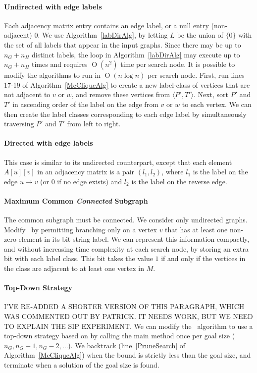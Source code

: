 \documentclass[letterpaper]{article}
\newcommand{\citet}[1]{\citeauthor{#1} \shortcite{#1}}
\newcommand{\McSplit}{\textproc{McSplit}}
\newcommand{\lineref}[1]{line~\ref{#1}}
\newcommand{\BigO}[1]{\ensuremath{\operatorname{O}\left(#1\right)}}
\begin{document}
\paragraph{Undirected with edge labels} Each adjacency matrix
entry contains an edge label, or a null entry (non-adjacent) $0$.
We use Algorithm~\ref{labDirAlg}, by letting $L$ be
the union of $\{0\}$ with the set of all labels that appear in the input
graphs. Since there may be up to $n_G + n_H$ distinct labels, the loop in
Algorithm~\ref{labDirAlg} may execute up to $n_G + n_H$ times and
requires $\BigO{n^2}$ time per search
node.  It is possible to modify the algorithms to run in $\BigO{n \log n}$ per
search node.  First, run lines 17-19
of Algorithm~\ref{McCliqueAlg} to create a new label-class of vertices that are not
adjacent to $v$ or $w$, and remove these vertices from $\langle P',T' \rangle$.
Next, sort $P'$ and $T'$ in ascending order of the label on the edge from $v$
or $w$ to each vertex. We can then create the label classes corresponding to
each edge label by simultaneously traversing $P'$ and $T'$ from left to right.

\paragraph{Directed with edge labels} This case is similar to its undirected
counterpart, except that each element $A[u][v]$ in an adjacency matrix is a
pair $(l_1, l_2)$, where $l_1$ is the label on the edge $u \rightarrow v$ (or 0
if no edge exists) and $l_2$ is the label on the reverse edge.

\paragraph{Maximum Common \emph{Connected} Subgraph} The common subgraph must
be connected. We consider only undirected graphs.  Modify \McSplit\ by
permitting branching only on a vertex $v$ that has at least one non-zero
element in its bit-string label.  We can represent this information compactly,
and without increasing time complexity at each search node, by storing an extra
bit with each label class.  This bit takes the value $1$ if and only if the vertices in
the class are adjacent to at least one vertex in $M$.

\paragraph{Top-Down Strategy} I'VE RE-ADDED A SHORTER VERSION OF THIS
PARAGRAPH, WHICH WAS COMMENTED OUT BY PATRICK. IT NEEDS WORK, BUT WE NEED TO
EXPLAIN THE SIP EXPERIMENT. We can modify the \McSplit\ algorithm to use a
top-down strategy based on \citet{UpcomingAAAIPaper} by calling the main
 method once per goal size ($n_G, n_G-1, n_G-2, \dots$).  We
backtrack (\lineref{PruneSearch} of Algorithm~\ref{McCliqueAlg}) when the bound is
strictly less than the goal size, and terminate when a solution of the goal
size is found.
\end{document}
